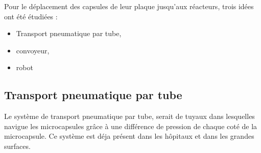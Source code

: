 Pour le déplacement des capsules de leur plaque jusqu'aux réacteurs, trois idées ont été étudiées : 
\begin{itemize}
    \item Transport pneumatique par tube,
    \item convoyeur,
    \item robot 
\end{itemize}
\subsection*{Transport pneumatique par tube}
Le système de transport pneumatique par tube, serait de tuyaux dans lesquelles navigue les microcapsules grâce à une différence de pression de chaque coté de la microcapsule. Ce système est déja présent dans les hôpitaux et dans les grandes surfaces.
